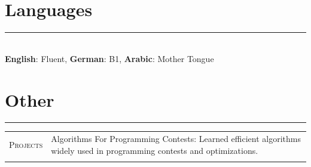 \documentclass[a4paper,13pt]{article}
\begin{document}
\begin{adjustwidth}{-3cm}{}
\section{Languages}
\rule[0pt]{20cm}{0.5pt}\\
\textbf{English}: Fluent, 
\textbf{German}: B1, 
\textbf{Arabic}: Mother Tongue

\section{Other} \label{praktikum}
\rule[0pt]{20cm}{0.5pt}

\begin{tabular}{r|p{17.5cm}}
	\textsc{Projects} &Algorithms For Programming Contests: Learned efficient algorithms widely used in programming contests and optimizations.\\\multicolumn{1}{c}{}
	
\end{tabular}




\end{adjustwidth}
\end{document}

